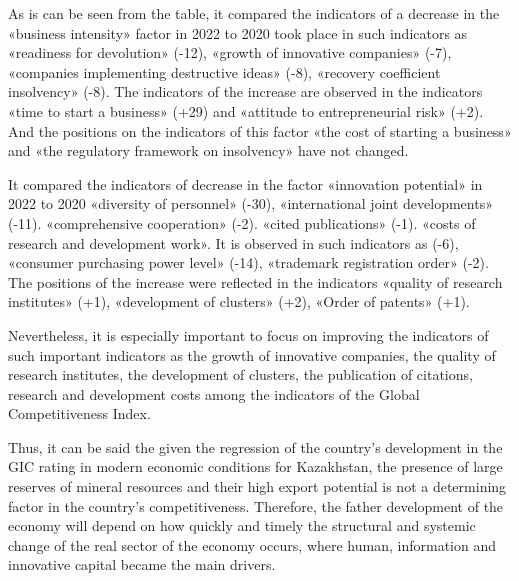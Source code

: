 {{%

As is can be seen from the table, it compared the indicators of a
decrease in the «business intensity» factor in 2022 to 2020 took place
in such indicators as «readiness for devolution» (-12), «growth of
innovative companies» (-7), «companies implementing destructive ideas»
(-8), «recovery coefficient insolvency» (-8). The indicators of the
increase are observed in the indicators «time to start a business» (+29)
and «attitude to entrepreneurial risk» (+2). And the positions on the
indicators of this factor «the cost of starting a business» and «the
regulatory framework on insolvency» have not changed.

It compared the indicators of decrease in the factor «innovation
potential» in 2022 to 2020 «diversity of personnel» (-30),
«international joint developments» (-11). «comprehensive cooperation»
(-2). «cited publications» (-1). «costs of research and development
work». It is observed in such indicators as (-6), «consumer purchasing
power level» (-14), «trademark registration order» (-2). The positions
of the increase were reflected in the indicators «quality of research
institutes» (+1), «development of clusters» (+2), «Order of patents»
(+1).

Nevertheless, it is especially important to focus on improving the
indicators of such important indicators as the growth of innovative
companies, the quality of research institutes, the development of
clusters, the publication of citations, research and development costs
among the indicators of the Global Competitiveness Index.

Thus, it can be said the given the regression of the country's
development in the GIC rating in modern economic conditions for
Kazakhstan, the presence of large reserves of mineral resources and
their high export potential is not a determining factor in the country's
competitiveness. Therefore, the father development of the economy will
depend on how quickly and timely the structural and systemic change of
the real sector of the economy occurs, where human, information and
innovative capital became the main drivers.

}}
